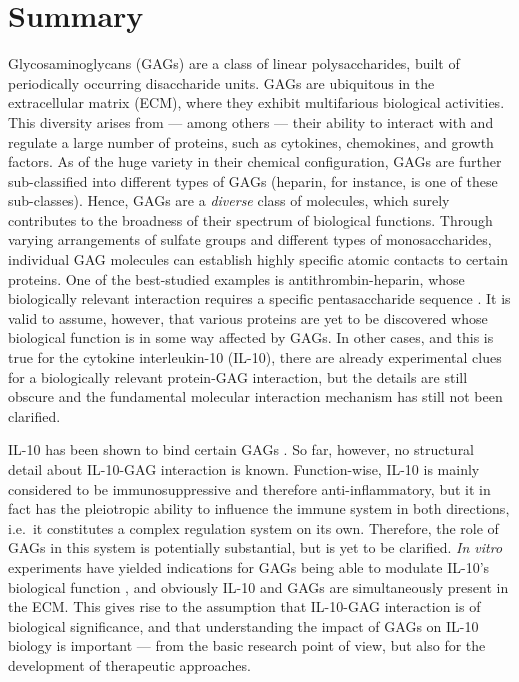 
\vspace{-0.5cm}

\chapter{Summary}



Glycosaminoglycans (GAGs) are a class of linear polysaccharides, built of
periodically occurring disaccharide units. GAGs are ubiquitous in the
extracellular matrix (ECM), where they exhibit multifarious biological
activities. This diversity arises from --- among others --- their ability to
interact with and regulate a large number of proteins, such as cytokines,
chemokines, and growth factors. As of the huge variety in their chemical
configuration, GAGs are further sub-classified into different types of GAGs
(heparin, for instance, is one of these sub-classes). Hence, GAGs are a
\textit{diverse} class of molecules, which surely contributes to the broadness
of their spectrum of biological functions. Through varying arrangements of
sulfate groups and different types of monosaccharides, individual GAG molecules
can establish highly specific atomic contacts to certain proteins. One of the
best-studied examples is antithrombin-heparin, whose biologically relevant
interaction requires a specific pentasaccharide sequence
\cite{antithrombin-thrombin-heparin-2004}. It is valid to assume, however, that
various proteins are yet to be discovered whose biological function is in some
way affected by GAGs. In other cases, and this is true for the cytokine
interleukin-10 (IL-10), there are already experimental clues for a biologically
relevant protein-GAG interaction, but the details are still obscure and the
fundamental molecular interaction mechanism has still not been clarified.

IL-10 has been shown to bind certain GAGs \cite{salek_ardakani_2000}. So far,
however, no structural detail about IL-10-GAG interaction is known.
Function-wise, IL-10 is mainly considered to be immunosuppressive and therefore
anti-inflammatory, but it in fact has the pleiotropic ability to influence the
immune system in both directions, i.e.\ it constitutes a complex regulation
system on its own. Therefore, the role of GAGs in this system is potentially
substantial, but is yet to be clarified. \textit{In vitro} experiments have
yielded indications for GAGs being able to modulate IL-10's biological function
\cite{salek_ardakani_2000}, and obviously IL-10 and GAGs are simultaneously
present in the ECM. This gives rise to the assumption that IL-10-GAG interaction
is of biological significance, and that understanding the impact of GAGs on
IL-10 biology is important --- from the basic research point of view, but also
for the development of therapeutic approaches.

